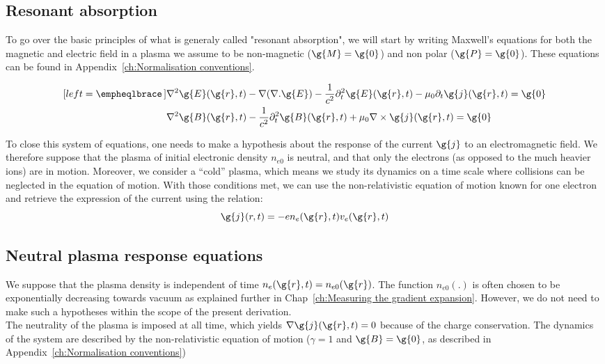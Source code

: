 \subsection{Resonant absorption}

To go over the basic principles of what is generaly called "resonant absorption", we will start by writing Maxwell's equations for both the magnetic and electric field in a plasma we assume to be non-magnetic ($\g{M}=\g{0}$) and non polar ($\g{P}=\g{0}$). These equations can be found in Appendix~\ref{ch:Normalisation conventions}.

\begin{subequations}
\label{eq:EandBequations}
\begin{align}[left = \empheqlbrace\,]
&\nabla^2 \g{E}(\g{r},t)  - \nabla ( \nabla. \g{E})  - \frac{1}{c^2} \partial_{t}^2 \g{E}(\g{r},t)  -\mu_0\partial_t \g{j}(\g{r},t) = \g{0}  \label{eq:Eequations}\\
&\nabla^2 \g{B}(\g{r},t) - \frac{1}{c^2}\partial_{t}^2 \g{B}(\g{r},t)  + \mu_0\nabla \times \g{j}(\g{r},t) =\g{0} \label{eq:Bequations} 
\end{align}
\end{subequations}

\noindent To close this system of equations, one needs to make a hypothesis about the response of the current $\g{j}$ to an electromagnetic field. We therefore suppose that the plasma of initial electronic density $n_{e0}$ is neutral, and that only the electrons (as opposed to the much heavier ions) are in motion. Moreover, we consider a ``cold'' plasma, which means we study its dynamics on a time scale where collisions can be neglected in the equation of motion. With those conditions met, we can use the non-relativistic equation of motion known for one electron and retrieve the expression of the current using the relation:
$$
\g{j}(r,t) = -en_e(\g{r},t) v_e(\g{r},t)
$$

\subsection{Neutral plasma response equations}

We suppose that the plasma density is independent of time $n_e(\g{r},t) = n_{e0}(\g{r})$. The function $n_{e0}(.)$ is often chosen to be exponentially decreasing towards vacuum as explained further in Chap~\ref{ch:Measuring the gradient expansion}. However, we do not need to make such a hypotheses within the scope of the present derivation.\\
The neutrality of the plasma is imposed at all time, which yields $\nabla \g{j}(\g{r},t) = 0$ because of the charge conservation. The dynamics of the system are described by the non-relativistic equation of motion ($\gamma =1$ and $\g{B}=\g{0}$, as described in Appendix~\ref{ch:Normalisation conventions})

